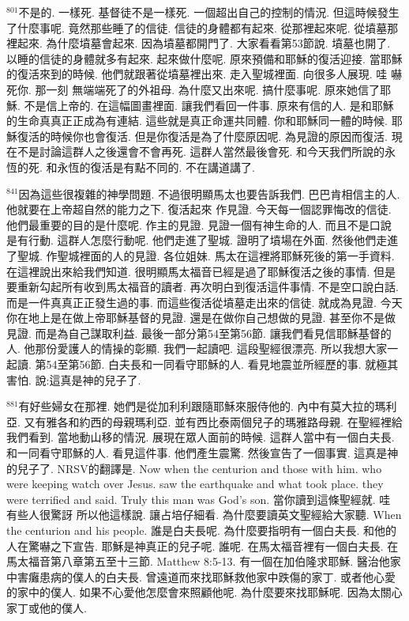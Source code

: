 \documentclass{book}
\begin{document}
$^{801}$不是的.
一樣死.
基督徒不是一樣死.
一個超出自己的控制的情況.
但這時候發生了什麼事呢.
竟然那些睡了的信徒.
信徒的身體都有起來.
從那裡起來呢.
從墳墓那裡起來.
為什麼墳墓會起來.
因為墳墓都開門了.
大家看看第53節說.
墳墓也開了.
以睡的信徒的身體就多有起來.
起來做什麼呢.
原來預備和耶穌的復活迎接.
當耶穌的復活來到的時候.
他們就跟著從墳墓裡出來.
走入聖城裡面.
向很多人展現.
哇 嚇死你.
那一刻 無端端死了的外祖母.
為什麼又出來呢.
搞什麼事呢.
原來她信了耶穌.
不是信上帝的.
在這幅圖畫裡面.
讓我們看回一件事.
原來有信的人.
是和耶穌的生命真真正正成為有連結.
這些就是真正命運共同體.
你和耶穌同一體的時候.
耶穌復活的時候你也會復活.
但是你復活是為了什麼原因呢.
為見證的原因而復活.
現在不是討論這群人之後還會不會再死.
這群人當然最後會死.
和今天我們所說的永恆的死.
和永恆的復活是有點不同的.
不在講道講了.

$^{841}$因為這些很複雜的神學問題.
不過很明顯馬太也要告訴我們.
巴巴肯相信主的人.
他就要在上帝超自然的能力之下.
復活起來 作見證.
今天每一個認罪悔改的信徒.
他們最重要的目的是什麼呢.
作主的見證.
見證一個有神生命的人.
而且不是口說 是有行動.
這群人怎麼行動呢.
他們走進了聖城.
證明了墳場在外面.
然後他們走進了聖城.
作聖城裡面的人的見證.
各位姐妹.
馬太在這裡將耶穌死後的第一手資料.
在這裡說出來給我們知道.
很明顯馬太福音已經是過了耶穌復活之後的事情.
但是要重新勾起所有收到馬太福音的讀者.
再次明白到復活這件事情.
不是空口說白話.
而是一件真真正正發生過的事.
而這些復活從墳墓走出來的信徒.
就成為見證.
今天你在地上是在做上帝耶穌基督的見證.
還是在做你自己想做的見證.
甚至你不是做見證.
而是為自己謀取利益.
最後一部分第54至第56節.
讓我們看見信耶穌基督的人.
他那份愛護人的情操的彰顯.
我們一起讀吧.
這段聖經很漂亮.
所以我想大家一起讀.
第54至第56節.
白夫長和一同看守耶穌的人.
看見地震並所經歷的事.
就極其害怕.
說:這真是神的兒子了.

$^{881}$有好些婦女在那裡.
她們是從加利利跟隨耶穌來服侍他的.
內中有莫大拉的瑪利亞.
又有雅各和約西的母親瑪利亞.
並有西比泰兩個兒子的瑪雅路母親.
在聖經裡給我們看到.
當地動山移的情況.
展現在眾人面前的時候.
這群人當中有一個白夫長.
和一同看守耶穌的人.
看見這件事.
他們產生震驚.
然後宣告了一個事實.
這真是神的兒子了.
NRSV的翻譯是.
Now when the centurion and those with him.
who were keeping watch over Jesus.
saw the earthquake and what took place.
they were terrified and said.
Truly this man was God's son.
當你讀到這條聖經就.
哇 有些人很驚訝 所以他這樣說.
讓占培仔細看.
為什麼要讀英文聖經給大家聽.
When the centurion and his people.
誰是白夫長呢.
為什麼要指明有一個白夫長.
和他的人在驚嚇之下宣告.
耶穌是神真正的兒子呢.
誰呢.
在馬太福音裡有一個白夫長.
在馬太福音第八章第五至十三節.
Matthew 8:5-13.
有一個在加伯隆求耶穌.
醫治他家中害癱患病的僕人的白夫長.
曾遠道而來找耶穌救他家中跌傷的家丁.
或者他心愛的家中的僕人.
如果不心愛他怎麼會來照顧他呢.
為什麼要來找耶穌呢.
因為太關心家丁或他的僕人.
\end{document}

